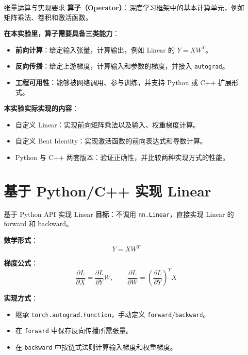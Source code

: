\documentclass[10pt, aspectratio=169]{beamer}
\begin{document}
\begin{frame}{张量运算与实现要求}
    \textbf{算子（Operator）}：深度学习框架中的基本计算单元，例如矩阵乘法、卷积和激活函数。
    \vspace{0.2cm}

    \textbf{在本实验里，算子需要具备三类能力}：
    \begin{itemize}
        \item \textbf{前向计算}：给定输入张量，计算输出，例如 Linear 的 $Y=XW^T$。
        \item \textbf{反向传播}：给定上游梯度，计算输入和参数的梯度，并接入 \texttt{autograd}。
        \item \textbf{工程可用性}：能够被网络调用、参与训练，并支持 Python 或 C++ 扩展形式。
    \end{itemize}

    \vspace{0.2cm}
    \textbf{本实验实际实现的内容}：
    \begin{itemize}
        \item 自定义 Linear：实现前向矩阵乘法以及输入、权重梯度计算。
        \item 自定义 Bent Identity：实现激活函数的前向表达式和导数计算。
        \item Python 与 C++ 两套版本：验证正确性，并比较两种实现方式的性能。
    \end{itemize}
\end{frame}

\section{基于 Python/C++ 实现 Linear}

\begin{frame}{基于 Python API 实现 Linear}
    \textbf{目标}：不调用 \texttt{nn.Linear}，直接实现 Linear 的 forward 和 backward。
    \vspace{0.2cm}

    \textbf{数学形式}：
    \[
        Y = XW^T
    \]

    \textbf{梯度公式}：
    \[
        \frac{\partial L}{\partial X} = \frac{\partial L}{\partial Y} W,
        \qquad
        \frac{\partial L}{\partial W} = \left(\frac{\partial L}{\partial Y}\right)^T X
    \]

    \vspace{0.15cm}
    \textbf{实现方式}：
    \begin{itemize}
        \item 继承 \texttt{torch.autograd.Function}，手动定义 \texttt{forward}/\texttt{backward}。
        \item 在 \texttt{forward} 中保存反向传播所需张量。
        \item 在 \texttt{backward} 中按链式法则计算输入梯度和权重梯度。
    \end{itemize}
\end{frame}
\end{document}
